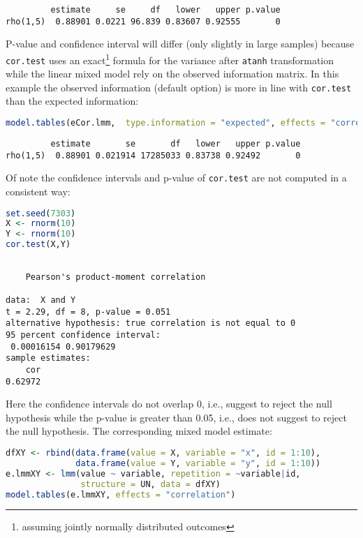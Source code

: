 \documentclass[12pt]{article}
\begin{document}
\label{}
\begin{verbatim}
         estimate     se     df   lower   upper p.value
rho(1,5)  0.88901 0.0221 96.839 0.83607 0.92555       0
\end{verbatim}


P-value and confidence interval will differ (only slightly in large
samples) because \texttt{cor.test} uses an exact\footnote{assuming jointly
normally distributed outcomes} formula for the variance after \texttt{atanh}
transformation while the linear mixed model rely on the observed
information matrix. In this example the observed information (default
option) is more in line with \texttt{cor.test} than the expected information:
\begin{lstlisting}[language=r,numbers=none]
model.tables(eCor.lmm,  type.information = "expected", effects = "correlation")["rho(1,5)",]
\end{lstlisting}

\label{}
\begin{verbatim}
         estimate       se       df   lower   upper p.value
rho(1,5)  0.88901 0.021914 17285033 0.83738 0.92492       0
\end{verbatim}


Of note the confidence intervals and p-value of \texttt{cor.test} are not
computed in a consistent way: 
\begin{lstlisting}[language=r,numbers=none]
set.seed(7303)
X <- rnorm(10)
Y <- rnorm(10)
cor.test(X,Y)
\end{lstlisting}

\label{}
\begin{verbatim}

	Pearson's product-moment correlation

data:  X and Y
t = 2.29, df = 8, p-value = 0.051
alternative hypothesis: true correlation is not equal to 0
95 percent confidence interval:
 0.00016154 0.90179629
sample estimates:
    cor 
0.62972
\end{verbatim}

\noindent Here the confidence intervals do not overlap 0, i.e.,
suggest to reject the null hypothesis while the p-value is greater
than 0.05, i.e., does not suggest to reject the null hypothesis. The
corresponding mixed model estimate:
\begin{lstlisting}[language=r,numbers=none]
dfXY <- rbind(data.frame(value = X, variable = "x", id = 1:10),
              data.frame(value = Y, variable = "y", id = 1:10))
e.lmmXY <- lmm(value ~ variable, repetition = ~variable|id,
               structure = UN, data = dfXY)
model.tables(e.lmmXY, effects = "correlation")
\end{lstlisting}
\end{document}
